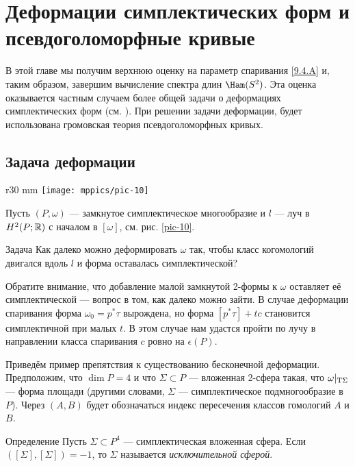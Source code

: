 \chapter[Деформации симплектических форм]{Деформации симплектических форм и псевдоголоморфные кривые}

В этой главе мы получим верхнюю оценку на параметр спаривания \ref{9.4.A} и, таким образом,
завершим вычисление спектра длин $\Ham(S^2)$.
Эта оценка оказывается частным случаем более общей задачи о деформациях симплектических форм (см. \cite{P7}).
При решении задачи деформации, будет использована громовская теория псевдоголоморфных кривых.

\section{Задача деформации}

\begin{wrapfigure}[8]{r}{30 mm}
\vskip-6mm
\centering
\texttt{[image: mppics/pic-10]}
\caption{}\label{pic-10}
\vskip0mm
\end{wrapfigure}

Пусть $(P, \omega)$ — замкнутое симплектическое многообразие и $l$ — луч в $H^2 (P;\mathbb{R})$ с началом в $[\omega]$, см. рис. \ref{pic-10}.

\begin{ex*}{Задача}
Как далеко можно деформировать $\omega$ так, чтобы класс когомологий двигался вдоль $l$ и форма оставалась симплектической? 
\end{ex*}

Обратите внимание, что добавление малой замкнутой 2-формы к $\omega$ оставляет её симплектической — вопрос в том, как далеко можно зайти.
В случае деформации спаривания форма $\omega_0=p^\ast \tau$ вырождена, но форма  $[p^\ast \tau ] + tc$ становится симплектичной при малых $t$.
В этом случае нам удастся пройти по лучу в направлении класса спаривания $c$ ровно на $\epsilon(P)$.

Приведём пример препятствия к существованию бесконечной деформации.
Предположим, что $\dim P = 4$ и что $\Sigma \subset P$ — вложенная 2-сфера такая, что $\omega|_{\mathrm{T} \Sigma}$ — форма площади (другими словами, $\Sigma$ — симплектическое подмногообразие в $P$).
Через $(A, B)$ будет обозначаться индекс пересечения классов гомологий $A$ и $B$.

\begin{ex*}{Определение}
Пусть $\Sigma \subset P^4$ — симплектическая вложенная сфера.
Если $([\Sigma], [\Sigma]) = -1$, то $\Sigma$ называется \emph{исключительной сферой}.
\end{ex*}

